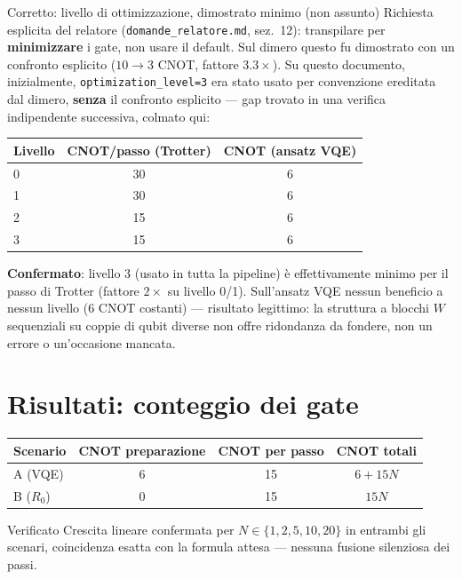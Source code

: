 \documentclass[11pt,a4paper]{article}
\begin{document}
\begin{okbox}{Corretto: livello di ottimizzazione, dimostrato minimo (non assunto)}
Richiesta esplicita del relatore (\texttt{domande\_relatore.md},
sez.~12): transpilare per \textbf{minimizzare} i gate, non usare il
default. Sul dimero questo fu dimostrato con un confronto esplicito
($10\to3$ CNOT, fattore $3.3\times$). Su questo documento,
inizialmente, \texttt{optimization\_level=3} era stato usato per
convenzione ereditata dal dimero, \textbf{senza} il confronto
esplicito --- gap trovato in una verifica indipendente successiva,
colmato qui:
\begin{center}
\renewcommand{\arraystretch}{1.25}
\begin{tabular}{@{}lcc@{}}
\toprule
\textbf{Livello} & \textbf{CNOT/passo (Trotter)} & \textbf{CNOT (ansatz VQE)}\\
\midrule
0 & 30 & 6\\
1 & 30 & 6\\
2 & 15 & 6\\
3 & 15 & 6\\
\bottomrule
\end{tabular}
\end{center}
\textbf{Confermato}: livello 3 (usato in tutta la pipeline) è
effettivamente minimo per il passo di Trotter (fattore $2\times$ su
livello 0/1). Sull'ansatz VQE nessun beneficio a nessun livello (6
CNOT costanti) --- risultato legittimo: la struttura a blocchi $W$
sequenziali su coppie di qubit diverse non offre ridondanza da fondere,
non un errore o un'occasione mancata.
\end{okbox}

\section{Risultati: conteggio dei gate}

\begin{center}
\renewcommand{\arraystretch}{1.3}
\begin{tabular}{@{}lccc@{}}
\toprule
\textbf{Scenario} & \textbf{CNOT preparazione} & \textbf{CNOT per passo} & \textbf{CNOT totali}\\
\midrule
A (VQE) & 6 & 15 & $6+15N$\\
B ($R_0$) & 0 & 15 & $15N$\\
\bottomrule
\end{tabular}
\end{center}

\begin{okbox}{Verificato}
Crescita lineare confermata per $N\in\{1,2,5,10,20\}$ in entrambi gli
scenari, coincidenza esatta con la formula attesa --- nessuna fusione
silenziosa dei passi.
\end{okbox}
\end{document}
